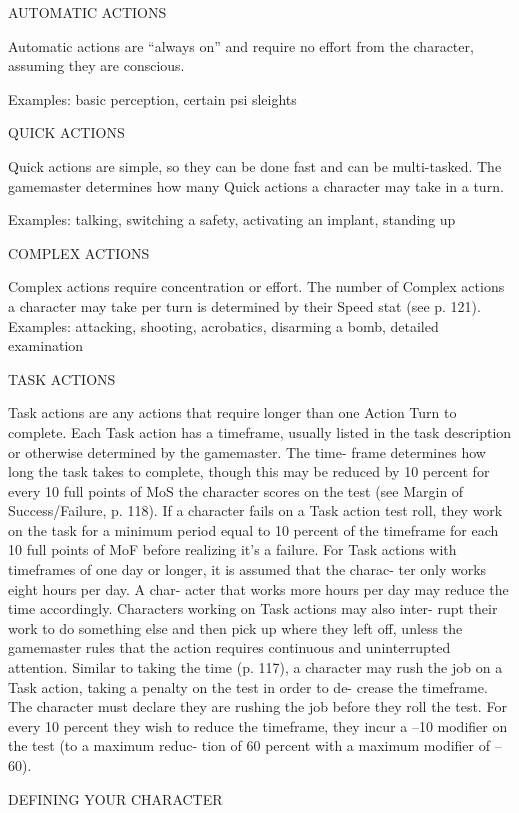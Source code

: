AUTOMATIC ACTIONS

Automatic actions are “always on” and require no
effort from the character, assuming they are conscious.

Examples: basic perception, certain psi sleights

QUICK ACTIONS

Quick actions are simple, so they can be done fast and
can be multi-tasked. The gamemaster determines how
many Quick actions a character may take in a turn.

Examples: talking, switching a safety, activating an
implant, standing up


COMPLEX ACTIONS

Complex actions require concentration or
effort. The number of Complex actions a
character may take per turn is determined
by their Speed stat (see p. 121).
  Examples: attacking, shooting, acrobatics,
disarming a bomb, detailed examination

TASK ACTIONS

Task actions are any actions that require
longer than one Action Turn to complete.
Each Task action has a timeframe, usually
listed in the task description or otherwise
determined by the gamemaster. The time-
frame determines how long the task takes
to complete, though this may be reduced by
10 percent for every 10 full points of MoS
the character scores on the test (see Margin
of Success/Failure, p. 118). If a character
fails on a Task action test roll, they work
on the task for a minimum period equal to
10 percent of the timeframe for each 10 full
points of MoF before realizing it's a failure.
   For Task actions with timeframes of one
day or longer, it is assumed that the charac-
ter only works eight hours per day. A char-
acter that works more hours per day may
reduce the time accordingly. Characters
working on Task actions may also inter-
rupt their work to do something else and
then pick up where they left off, unless the
gamemaster rules that the action requires
continuous and uninterrupted attention.
   Similar to taking the time (p. 117), a
character may rush the job on a Task action,
taking a penalty on the test in order to de-
crease the timeframe. The character must
declare they are rushing the job before they
roll the test. For every 10 percent they wish
to reduce the timeframe, they incur a –10
modifier on the test (to a maximum reduc-
tion of 60 percent with a maximum modifier
of –60).


DEFINING YOUR CHARACTER

